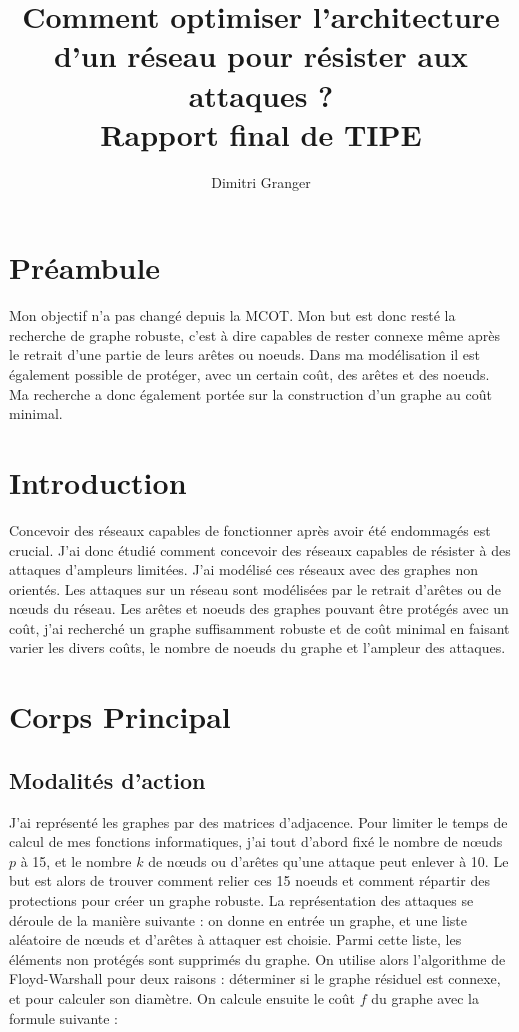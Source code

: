 \documentclass[12pt,a4paper]{article}
\title{Comment optimiser l'architecture d'un réseau pour résister aux attaques ?\\
Rapport final de TIPE}
\author{Dimitri Granger}
\begin{document}
\maketitle

\section{Préambule}
Mon objectif n'a pas changé depuis la MCOT. Mon but est donc resté la recherche de graphe robuste,
c'est à dire capables de rester connexe même après le retrait d'une partie de leurs arêtes ou noeuds. Dans ma 
modélisation il est également possible de protéger, avec un certain coût, des arêtes et des noeuds. Ma recherche a donc également portée sur la construction d'un graphe au coût minimal.

\section{Introduction}

Concevoir des réseaux capables de fonctionner après avoir été endommagés est crucial. J'ai donc étudié comment concevoir des réseaux capables de résister à des attaques d'ampleurs limitées.  J'ai modélisé ces réseaux avec des graphes non orientés. Les attaques sur un réseau sont modélisées par le retrait d'arêtes ou de nœuds du réseau. Les arêtes et noeuds des graphes pouvant être protégés avec un coût, j'ai recherché un graphe suffisamment robuste et de coût minimal en faisant varier les divers coûts, le nombre de noeuds du graphe et l'ampleur des attaques.



\section{Corps Principal}
\subsection{Modalités d'action}


J'ai représenté les graphes par des matrices d'adjacence. Pour limiter le temps de calcul de mes fonctions informatiques, j'ai tout d'abord fixé le nombre de nœuds $p$  à 15, et le nombre $k$ de nœuds ou d'arêtes qu'une attaque peut enlever à 10. Le but est alors de trouver comment relier ces 15 noeuds et comment répartir des protections pour créer un graphe robuste. La représentation des attaques se déroule de la manière suivante : on donne en entrée un graphe, et une liste aléatoire de nœuds et d'arêtes à attaquer est choisie. Parmi cette liste, les éléments non protégés sont supprimés du graphe. On utilise alors l'algorithme de Floyd-Warshall pour deux raisons : déterminer si le graphe résiduel est connexe, et pour calculer son diamètre. On calcule ensuite le coût $f$ du graphe avec la formule suivante :
\end{document}
